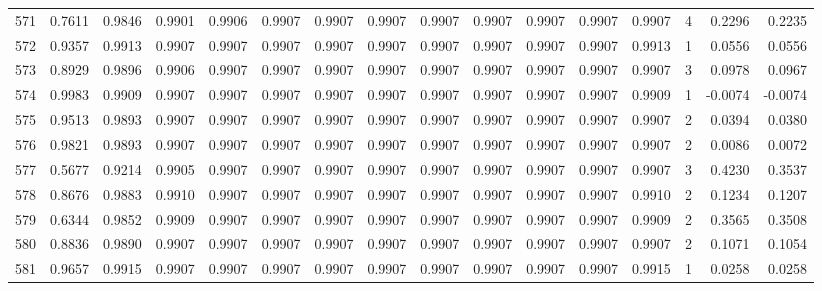 \begin{tabular}{lrrrrrrrrrrrrrrr}
571 &      0.7611 &  0.9846 &  0.9901 &  0.9906 &  0.9907 &  0.9907 &  0.9907 &  0.9907 &  0.9907 &  0.9907 &   0.9907 &     0.9907 &      4 &                    0.2296 &                     0.2235 \\
572 &      0.9357 &  0.9913 &  0.9907 &  0.9907 &  0.9907 &  0.9907 &  0.9907 &  0.9907 &  0.9907 &  0.9907 &   0.9907 &     0.9913 &      1 &                    0.0556 &                     0.0556 \\
573 &      0.8929 &  0.9896 &  0.9906 &  0.9907 &  0.9907 &  0.9907 &  0.9907 &  0.9907 &  0.9907 &  0.9907 &   0.9907 &     0.9907 &      3 &                    0.0978 &                     0.0967 \\
574 &      0.9983 &  0.9909 &  0.9907 &  0.9907 &  0.9907 &  0.9907 &  0.9907 &  0.9907 &  0.9907 &  0.9907 &   0.9907 &     0.9909 &      1 &                   -0.0074 &                    -0.0074 \\
575 &      0.9513 &  0.9893 &  0.9907 &  0.9907 &  0.9907 &  0.9907 &  0.9907 &  0.9907 &  0.9907 &  0.9907 &   0.9907 &     0.9907 &      2 &                    0.0394 &                     0.0380 \\
576 &      0.9821 &  0.9893 &  0.9907 &  0.9907 &  0.9907 &  0.9907 &  0.9907 &  0.9907 &  0.9907 &  0.9907 &   0.9907 &     0.9907 &      2 &                    0.0086 &                     0.0072 \\
577 &      0.5677 &  0.9214 &  0.9905 &  0.9907 &  0.9907 &  0.9907 &  0.9907 &  0.9907 &  0.9907 &  0.9907 &   0.9907 &     0.9907 &      3 &                    0.4230 &                     0.3537 \\
578 &      0.8676 &  0.9883 &  0.9910 &  0.9907 &  0.9907 &  0.9907 &  0.9907 &  0.9907 &  0.9907 &  0.9907 &   0.9907 &     0.9910 &      2 &                    0.1234 &                     0.1207 \\
579 &      0.6344 &  0.9852 &  0.9909 &  0.9907 &  0.9907 &  0.9907 &  0.9907 &  0.9907 &  0.9907 &  0.9907 &   0.9907 &     0.9909 &      2 &                    0.3565 &                     0.3508 \\
580 &      0.8836 &  0.9890 &  0.9907 &  0.9907 &  0.9907 &  0.9907 &  0.9907 &  0.9907 &  0.9907 &  0.9907 &   0.9907 &     0.9907 &      2 &                    0.1071 &                     0.1054 \\
581 &      0.9657 &  0.9915 &  0.9907 &  0.9907 &  0.9907 &  0.9907 &  0.9907 &  0.9907 &  0.9907 &  0.9907 &   0.9907 &     0.9915 &      1 &                    0.0258 &                     0.0258 \\

\end{tabular}
